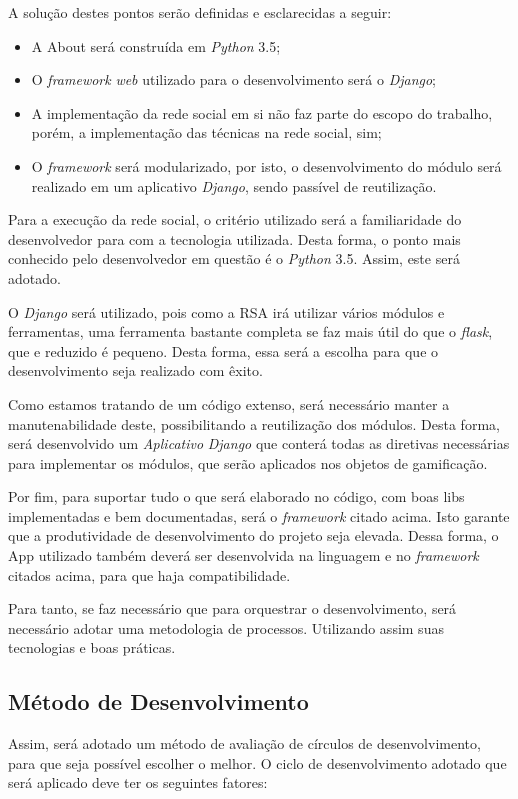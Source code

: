 A solução destes pontos serão definidas e esclarecidas a seguir:

\begin{itemize}
    \item A About será construída em \textit{Python} 3.5;
    \item  O \textit{framework} \textit{web} utilizado para o desenvolvimento será o \textit{Django};
    \item A implementação da rede social em si não faz parte do escopo do trabalho, porém, a implementação
        das técnicas na rede social, sim;
    \item O \textit{framework} será modularizado, por isto, o desenvolvimento do módulo será realizado em um aplicativo
        \textit{Django}, sendo passível de reutilização.
\end{itemize}

Para a execução da rede social, o critério utilizado será a familiaridade do desenvolvedor para com a tecnologia
utilizada. Desta forma, o  ponto mais conhecido pelo desenvolvedor em questão é o \textit{Python} 3.5. Assim, este será adotado.

O \textit{Django} será utilizado, pois como a RSA irá utilizar vários módulos e ferramentas, uma ferramenta  bastante completa
se faz mais útil do que o \textit{flask}, que e reduzido é pequeno. Desta forma, essa será a escolha para que o desenvolvimento seja
realizado com êxito.

Como estamos tratando de um código extenso, será necessário manter a manutenabilidade deste, possibilitando a reutilização dos
módulos. Desta forma, será desenvolvido um \textit{Aplicativo} \textit{Django} que conterá todas as diretivas necessárias para implementar os módulos, que serão aplicados
nos objetos de gamificação.

Por fim, para suportar tudo o que será elaborado no código, com boas libs implementadas e bem documentadas, será o \textit{framework} citado
acima. Isto garante que a produtividade de desenvolvimento do projeto seja elevada. Dessa forma, o App utilizado também deverá ser
desenvolvida na linguagem e no \textit{framework} citados acima, para que haja compatibilidade.

Para tanto, se faz necessário que para orquestrar o desenvolvimento, será necessário adotar uma metodologia de processos. Utilizando 
assim suas tecnologias e boas práticas.

\subsection{Método de Desenvolvimento}
\label{sub:m_todo_de_desenvolvimento}
Assim, será adotado um método de avaliação de círculos de desenvolvimento, para que seja possível escolher o melhor.
O ciclo de desenvolvimento adotado que será aplicado deve ter os seguintes fatores:


